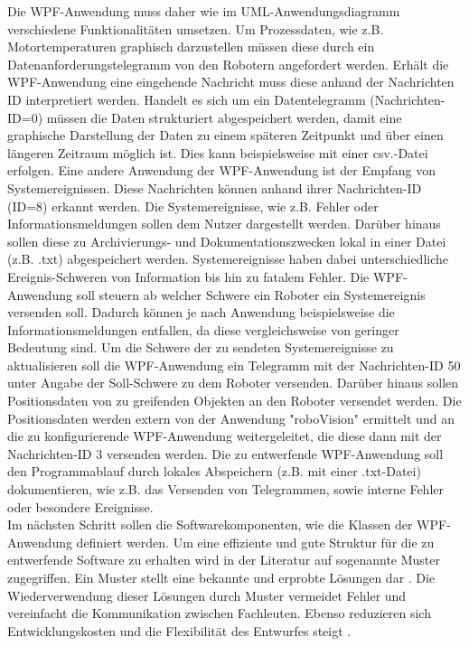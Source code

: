 \documentclass[ a4paper,
                oneside,
                toc=bibliography,
                toc=listof
                ]{scrbook}
\begin{document}
	Die WPF-Anwendung muss daher wie im UML-Anwendungsdiagramm verschiedene Funktionalitäten umsetzen. Um Prozessdaten, wie z.B. Motortemperaturen graphisch darzustellen müssen diese durch ein Datenanforderungstelegramm von den Robotern angefordert werden. Erhält die WPF-Anwendung eine eingehende Nachricht muss diese anhand der Nachrichten ID interpretiert werden. Handelt es sich um ein Datentelegramm (Nachrichten-ID=0) müssen die Daten strukturiert abgespeichert werden, damit eine graphische Darstellung der Daten zu einem späteren Zeitpunkt und über einen längeren Zeitraum möglich ist. Dies kann beispielsweise mit einer csv.-Datei erfolgen. Eine andere Anwendung der WPF-Anwendung ist der Empfang von Systemereignissen. Diese Nachrichten können anhand ihrer Nachrichten-ID (ID=8) erkannt werden. Die Systemereignisse, wie z.B. Fehler oder Informationsmeldungen sollen dem Nutzer dargestellt werden. Darüber hinaus sollen diese zu Archivierungs- und Dokumentationszwecken lokal in einer Datei (z.B. .txt) abgespeichert werden. Systemereignisse haben dabei unterschiedliche Ereignis-Schweren von Information bis hin zu fatalem Fehler. Die WPF-Anwendung soll steuern ab welcher Schwere ein Roboter ein Systemereignis versenden soll. Dadurch können je nach Anwendung beispielsweise die Informationsmeldungen entfallen, da diese vergleichsweise von geringer Bedeutung sind. Um die Schwere der zu sendeten Systemereignisse zu aktualisieren soll die WPF-Anwendung ein Telegramm mit der Nachrichten-ID 50 unter Angabe der Soll-Schwere zu dem Roboter versenden. Darüber hinaus sollen Positionsdaten von zu greifenden Objekten an den Roboter versendet werden. Die Positionsdaten werden extern von der Anwendung "roboVision" ermittelt und an die zu konfigurierende WPF-Anwendung weitergeleitet, die diese dann mit der Nachrichten-ID 3 versenden werden. Die zu entwerfende WPF-Anwendung soll den Programmablauf durch lokales Abspeichern (z.B. mit einer .txt-Datei) dokumentieren, wie z.B. das Versenden von Telegrammen, sowie interne Fehler oder besondere Ereignisse.\\
	Im nächsten Schritt sollen die Softwarekomponenten, wie die Klassen der WPF-Anwendung definiert werden. Um eine effiziente und gute Struktur für die zu entwerfende Software zu erhalten wird in der Literatur auf sogenannte Muster zugegriffen. Ein Muster stellt eine bekannte und erprobte Lösungen dar \cite{agileSoftware}. Die Wiederverwendung dieser Lösungen durch Muster vermeidet Fehler und vereinfacht die Kommunikation zwischen Fachleuten. Ebenso reduzieren sich Entwicklungskosten und die Flexibilität des Entwurfes steigt \cite{ArchitekturmusterGoll}.\\
\end{document}
